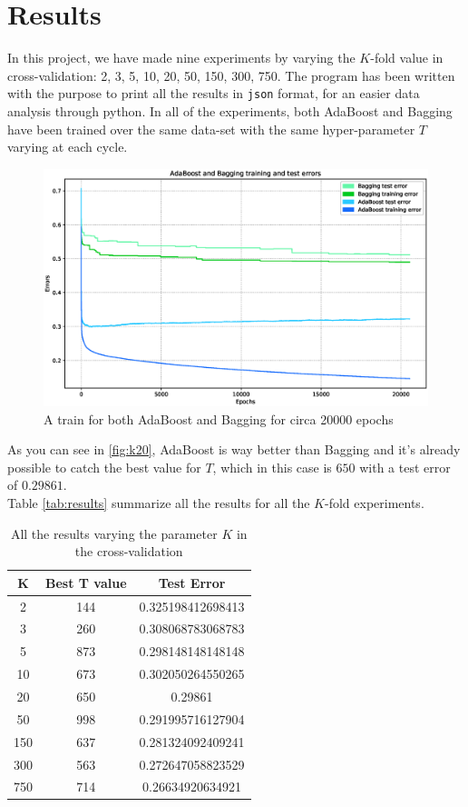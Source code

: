 
\chapter{Results}

In this project, we have made nine experiments by varying the $K$-fold value in cross-validation: 2, 3, 5, 10, 20, 50, 150, 300, 750. The program has been written with the purpose to print all the results in \texttt{json} format, for an easier data analysis through python. In all of the experiments, both AdaBoost and Bagging have been trained over the same data-set with the same hyper-parameter $T$ varying at each cycle.\\
\begin{figure}[htpb]
	\centering
	\includegraphics[scale=0.35]{figs/report_k20.eps}
	\caption{A train for both AdaBoost and Bagging for circa 20000 epochs}
	\label{fig:k20}
\end{figure}
As you can see in \autoref{fig:k20}, AdaBoost is way better than Bagging and it's already possible to catch the best value for $T$, which in this case is $650$ with a test error of $0.29861$.\\
Table \autoref{tab:results} summarize all the results for all the $K$-fold experiments.

\begin{table}
\centering
\begin{tabular}{|c|c|c|}
	\hline 
	K & Best T value & Test Error \\ 
	\hline 
	2 & 144 & 0.325198412698413 \\ 
	\hline 
	3 & 260 & 0.308068783068783 \\ 
	\hline 
	5 & 873 & 0.298148148148148 \\ 
	\hline 
	10 & 673 & 0.302050264550265 \\ 
	\hline 
	20 & 650 & 0.29861 \\ 
	\hline 
	50 & 998 & 0.291995716127904 \\ 
	\hline 
	150 & 637 & 0.281324092409241 \\ 
	\hline 
	300 & 563 & 0.272647058823529 \\ 
	\hline 
	750 & 714 & 0.26634920634921 \\ 
	\hline 
\end{tabular}
\caption{All the results varying the parameter $K$ in the cross-validation}
\label{tab:results} 
\end{table}
